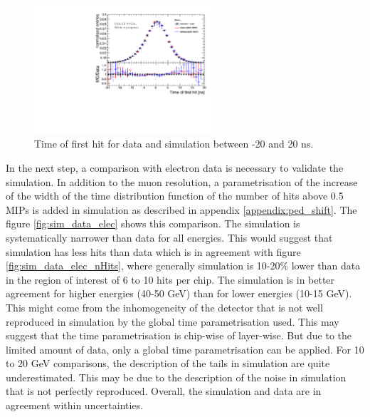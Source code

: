 \begin{figure}[t]
	\centering
	\includegraphics[width=0.6\textwidth]{chap5/fig_AHCAL_timing/Muons/Comparison_MokkaDD4hepData_Muons.pdf}
	\caption{Time of first hit for data and simulation between -20 and 20 ns.}
	\label{fig:sim_data_muon}
\end{figure}

In the next step, a comparison with electron data is necessary to validate the simulation. In addition to the muon resolution, a parametrisation of the increase of the width of the time distribution function of the number of hits above 0.5 MIPs is added in simulation as described in appendix \ref{appendix:ped_shift}. The figure \ref{fig:sim_data_elec} shows this comparison. The simulation is systematically narrower than data for all energies. This would suggest that simulation has less hits than data which is in agreement with figure \ref{fig:sim_data_elec_nHits}, where generally simulation is 10-20\% lower than data in the region of interest of 6 to 10 hits per chip. The simulation is in better agreement for higher energies (40-50 GeV) than for lower energies (10-15 GeV). This might come from the inhomogeneity of the detector that is not well reproduced in simulation by the global time parametrisation used. This may suggest that the time parametrisation is chip-wise of layer-wise. But due to the limited amount of data, only a global time parametrisation can be applied. For 10 to 20 GeV comparisons, the description of the tails in simulation are quite underestimated. This may be due to the description of the noise in simulation that is not perfectly reproduced. Overall, the simulation and data are in agreement within uncertainties.

